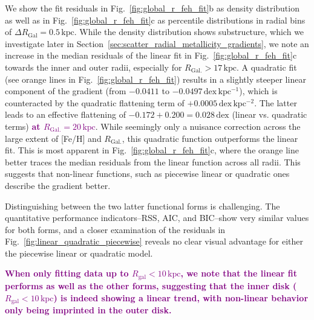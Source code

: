 \documentclass[twocolumn,apj,numberedappendix,appendixfloats,twocolappendix]{openjournal}
\newcommand{\adjusted}[1]{\textbf{\textcolor{purple}{#1}}}
\begin{document}
\begin{CJK*}{UTF8}{gbsn}
We show the fit residuals in Fig.~\ref{fig:global_r_feh_fit}b as density distribution as well as in Fig.~\ref{fig:global_r_feh_fit}c as percentile distributions in radial bins of $\Delta R_\mathrm{Gal} = 0.5\,\mathrm{kpc}$. While the density distribution shows substructure, which we investigate later in Section~\ref{sec:scatter_radial_metallicity_gradients}, we note an increase in the median residuals of the linear fit in Fig.~\ref{fig:global_r_feh_fit}c towards the inner and outer radii, especially for $R_\mathrm{Gal.} > 17\,\mathrm{kpc}$. A quadratic fit (see orange lines in Fig.~\ref{fig:global_r_feh_fit}) results in a slightly steeper linear component of the gradient (from $-0.0411$ to $-0.0497\,\mathrm{dex\,kpc^{-1}}$), which is counteracted by the quadratic flattening term of $+0.0005\,\mathrm{dex\,kpc^{-2}}$. The latter leads to an effective flattening of $-0.172 + 0.200 = 0.028\,\mathrm{dex}$ (linear vs. quadratic terms) \adjusted{at $R_\mathrm{Gal.} = 20\,\mathrm{kpc}$}. While seemingly only a nuisance correction across the large extent of [Fe/H] and $R_\mathrm{Gal.}$, this quadratic function outperforms the linear fit. This is most apparent in Fig.~\ref{fig:global_r_feh_fit}c, where the orange line better traces the median residuals from the linear function across all radii. This suggests that non-linear functions, such as piecewise linear or quadratic ones describe the gradient better.

Distinguishing between the two latter functional forms is challenging. The quantitative performance indicators--RSS, AIC, and BIC--show very similar values for both forms, and a closer examination of the residuals in Fig.~\ref{fig:linear_quadratic_piecewise} reveals no clear visual advantage for either the piecewise linear or quadratic model.

\adjusted{When only fitting data up to $R_\mathrm{gal} < 10\,\mathrm{kpc}$, we note that the linear fit performs as well as the other forms, suggesting that the inner disk ($R_\mathrm{gal} < 10\,\mathrm{kpc}$) is indeed showing a linear trend, with non-linear behavior only being imprinted in the outer disk.}


\end{CJK*}
\end{document}
